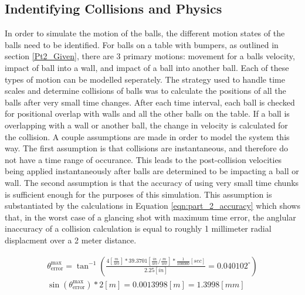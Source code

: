 \documentclass[12pt]{article}
\begin{document}
\subsection{Indentifying Collisions and Physics}

In order to simulate the motion of the balls, the different motion states of the balls need to be identified. For balls on a table with bumpers, as outlined in section \ref{Pt2_Given}, there are 3 primary motions: movement for a balls velocity, impact of ball into a wall, and impact of a ball into another ball. Each of these types of motion can be modelled seperately. The strategy used to handle time scales and determine collisions of balls was to calculate the positions of all the balls after very small time changes. After each time interval, each ball is checked for positional overlap with walls and all the other balls on the table. If a ball is overlapping with a wall or another ball, the change in velocity is calculated for the collision. A couple assumptions are made in order to model the system this way. The first assumption is that collisions are instantaneous, and therefore do not have a time range of occurance. This leads to the post-collision velocities being applied instantaneously after balls are determined to be impacting a ball or wall. The second assumption is that the accuracy of using very small time chunks is sufficient enough for the purposes of this simulation. This assumption is substantiated by the calculations in Equation \ref{eqn:part_2_accuracy} which shows that, in the worst case of a glancing shot with maximum time error, the anglular inaccuracy of a collision calculation is equal to roughly 1 millimeter radial displacment over a 2 meter distance.

\begin{equation}
    \label{eqn:part_2_accuracy}
    \begin{gathered}
        \theta_\text{error}^\text{max} = \tan^{-1}\left( \frac{4 \left[\frac{m}{sec}\right] * 
                                         39.3701 \left[\frac{in}{sec}/\frac{m}{sec}\right] *
                                         \frac{1}{100000} \left[sec\right]}{2.25 \left[in\right]} =
                                         0.040102^{\circ}\right)\\
        \sin(\theta_\text{error}^\text{max}) * 2 \left[m\right] = 0.0013998 \left[m\right] = 1.3998 \left[mm\right]
    \end{gathered}
\end{equation}
\end{document}
